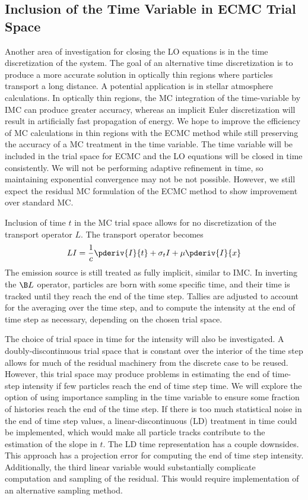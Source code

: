 
\subsection{Inclusion of the Time Variable in ECMC Trial Space}

\label{sec:time}
Another area of investigation for closing the LO equations is in the time discretization
of the system.  The goal of
an alternative time discretization is to produce a more accurate solution in optically
thin regions where particles transport a long distance.  A potential application is in 
stellar atmosphere calculations.  In optically thin regions, the MC
integration of the time-variable by IMC can produce greater accuracy, whereas an implicit
Euler discretization will result in artificially fast propagation of energy.  We hope to improve
the efficiency of MC calculations in thin regions with the ECMC method while still preserving the
accuracy of a MC treatment in the time variable.  The time variable will be included in
the trial space for ECMC and the LO equations will be closed in time consistently.  We
will not be performing adaptive refinement in time, so maintaining exponential convergence
may not be not possible.  However, we still expect the residual MC formulation of the ECMC method
to show improvement over standard MC.

Inclusion of time $t$ in the MC trial space allows for no discretization of the
transport operator $L$.  The transport operator becomes
\begin{equation}
    LI = \frac{1}{c}\pderiv{I}{t} + \sigma_t I + \mu \pderiv{I}{x}
\end{equation}
The emission source
is still treated as fully implicit, similar to IMC.
  In inverting the $\B L$ operator, particles are born with some specific
time, and their time is tracked until they reach the end of the time step.  Tallies are adjusted
to account for the averaging over the time step, and to compute the intensity at the end
of time step as necessary, depending on the chosen trial space.

The choice of trial space in time for the intensity will also be investigated.  A doubly-discontinuous
trial space that is constant over the interior of the time step allows for much of the
residual machinery from the discrete case to be reused.  However, this trial space may produce problems in estimating the end of
time-step intensity if few particles reach the end of time step time.  We will explore the
option of using importance sampling in the time variable to ensure some fraction of
histories reach the end of the time step.  If there is too much statistical noise in the
end of time step values, a
linear-discontinuous (LD) treatment in time could be implemented, which would make all
particle tracks contribute to the estimation of the slope in $t$.  The LD time
representation has a couple downsides.  This approach has a projection error for computing
the end of time step intensity.  Additionally, the third linear variable would
substantially complicate computation and sampling of the residual.  This would require
implementation of an alternative sampling method.

